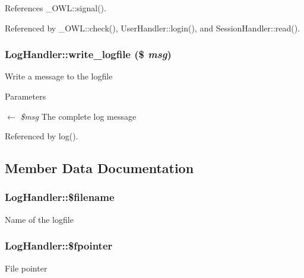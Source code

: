 References \_\-OWL::signal().



Referenced by \_\-OWL::check(), UserHandler::login(), and SessionHandler::read().

\subsubsection[{write\_\-logfile}]{\setlength{\rightskip}{0pt plus 5cm}LogHandler::write\_\-logfile (\$ {\em msg})}\label{classLogHandler_ae0cd68fb6f068e47f899a1e4c7f29ba9}
Write a message to the logfile


\begin{DoxyParams}{Parameters}
\item[\mbox{$\leftarrow$} {\em \$msg}]The complete log message \end{DoxyParams}


Referenced by log().



\subsection{Member Data Documentation}
\subsubsection[{\$filename}]{\setlength{\rightskip}{0pt plus 5cm}LogHandler::\$filename}\label{classLogHandler_ab51c12bcd654093b9d0153ab38ebad8c}
Name of the logfile 
\subsubsection[{\$fpointer}]{\setlength{\rightskip}{0pt plus 5cm}LogHandler::\$fpointer}\label{classLogHandler_ad65c8954bda40d8a33828f0a0a2cbf5b}
File pointer 
